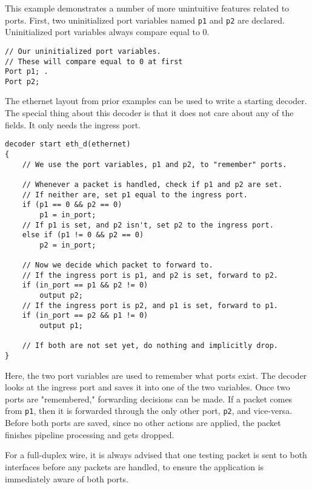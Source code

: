 This example demonstrates a number of more unintuitive features related to
ports. First, two uninitialized port variables named \texttt{p1} and
\texttt{p2} are declared. Uninitialized port variables always compare equal to 0.

\begin{codepage}
\begin{lstlisting}
// Our uninitialized port variables.
// These will compare equal to 0 at first
Port p1; .
Port p2;
\end{lstlisting}
\end{codepage}

The ethernet layout from prior examples can be used to write a starting decoder. The
special thing about this decoder is that it does not care about any of the fields.
It only needs the ingress port.

\begin{codepage}
\begin{lstlisting}
decoder start eth_d(ethernet)
{
	// We use the port variables, p1 and p2, to "remember" ports.

	// Whenever a packet is handled, check if p1 and p2 are set.
	// If neither are, set p1 equal to the ingress port.
	if (p1 == 0 && p2 == 0)
		p1 = in_port;
	// If p1 is set, and p2 isn't, set p2 to the ingress port.
	else if (p1 != 0 && p2 == 0)
		p2 = in_port;

	// Now we decide which packet to forward to.
	// If the ingress port is p1, and p2 is set, forward to p2.
	if (in_port == p1 && p2 != 0)
		output p2;
	// If the ingress port is p2, and p1 is set, forward to p1.
	if (in_port == p2 && p1 != 0)
		output p1;

	// If both are not set yet, do nothing and implicitly drop.
}
\end{lstlisting}
\end{codepage}

Here, the two port variables are used to remember what ports exist. The decoder
looks at the ingress port and saves it into one of the two variables. Once two
ports are "remembered," forwarding decisions can be made. If a packet comes from
\texttt{p1}, then it is forwarded through the only other port, \texttt{p2}, and
vice-versa. Before both ports are saved, since no other actions are applied, the
packet finishes pipeline processing and gets dropped.

For a full-duplex wire, it is always advised that one testing packet is sent to both interfaces before any packets are handled, to ensure the application is immediately aware of both ports.
